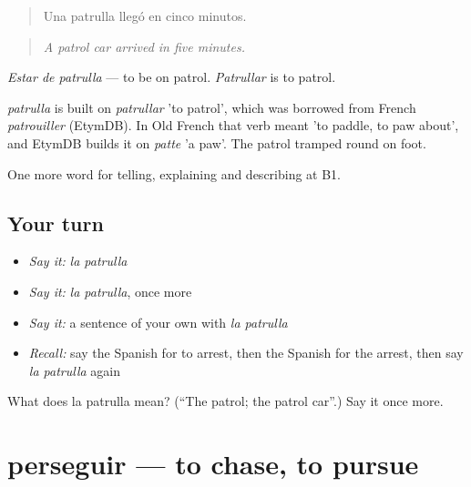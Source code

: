 \begin{quote}
Una patrulla llegó en cinco minutos.
\end{quote}

\begin{quote}
\emph{A patrol car arrived in five minutes.}
\end{quote}

\emph{Estar de patrulla} — to be on patrol. \emph{Patrullar} is to patrol.

\begin{cousinweb}
\emph{patrulla} is built on \emph{patrullar} 'to patrol', which was borrowed from French \emph{patrouiller} (EtymDB). In Old French that verb meant 'to paddle, to paw about', and EtymDB builds it on \emph{patte} 'a paw'. The patrol tramped round on foot.
\end{cousinweb}

\begin{grammarlens}[title={What you've built}]
One more word for telling, explaining and describing at B1.
\end{grammarlens}

\subsection*{Your turn}
\begin{itemize}
\raggedright
  \item \emph{Say it:} \emph{la patrulla}
  \item \emph{Say it:} \emph{la patrulla}, once more
  \item \emph{Say it:} a sentence of your own with \emph{la patrulla}
  \item \emph{Recall:} say the Spanish for to arrest, then the Spanish for the arrest, then say \emph{la patrulla} again
\end{itemize}

\begin{tcolorbox}[breakable,colback=teal!4,colframe=teal!35!black,title={Before you move on}]
What does la patrulla mean? (\textquotedblleft{}The patrol; the patrol car\textquotedblright{}.) Say it once more.
\end{tcolorbox}
\section[perseguir]{perseguir — to chase, to pursue}

\label{lesson:ES-C519-perseguir}



